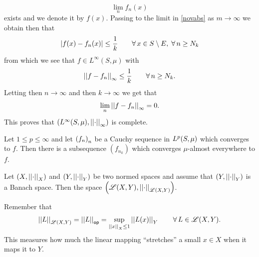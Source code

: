 \documentclass{article}
\begin{document}
\begin{fancyproof}
\begin{itemize}
\begin{equation*}
			\lim_{n}f_{n}(x)
		\end{equation*}
		exists and we denote it by $f(x)$. Passing to the limit in \ref{novabs} as $m\to\infty$ we obtain then that 
		\begin{equation*}
			\left|f(x)-f_{n}(x)\right|\leq\frac{1}{k}\qquad\forall\, x\in S\setminus E,\;\forall\, n\geq N_{k}
		\end{equation*}
		from which we see that $f\in L^{\infty}(S,\mu)$ with
		\begin{equation*}
			\left|\left|f-f_{n}\right|\right|_{\infty}\leq\frac{1}{k}\qquad\forall\, n\geq N_{k}.
		\end{equation*}
		Letting then $n\to\infty$ and then $k\to\infty$ we get that 
		\begin{equation*}
			\lim_{n}\left|\left|f-f_{n}\right|\right|_{\infty}=0.
		\end{equation*}
		This proves that $\left(L^{\infty}(S,\mu),\left|\left|\cdot\right|\right|_{\infty}\right)$ is complete.
	\end{itemize}
\end{fancyproof}
\begin{proposition}
	Let $1\leq p\leq\infty$ and let ${\left({f}_{n}\right)}_{n}$ be a Cauchy sequence in $L^{p}(S,\mu)$ which converges to $f$. Then there is a subsequence $\left(f_{n_{k}}\right)$ which converges $\mu$-almost everywhere to $f$.
\end{proposition}
\begin{proposition}
	Let $\left(X,\left|\left|\cdot\right|\right|_{X}\right)$ and $\left(Y,\left|\left|\cdot\right|\right|_{Y}\right)$ be two normed spaces and assume that $(Y,\left|\left|\cdot\right|\right|_{Y})$ is a Banach space. Then the space $\left(\mathscr{L}(X,Y),\left|\left|\cdot\right|\right|_{\mathscr{L}(X,Y)}\right)$.
\end{proposition}
Remember that 
\begin{equation*}
	\left|\left|L\right|\right|_{\mathscr{L}(X,Y)}=\left|\left|L\right|\right|_{\mathsf{op}}=\sup_{\left|\left|x\right|\right|_{X}\leq 1}\left|\left|L(x)\right|\right|_{Y}\qquad\forall\, L\in\mathscr{L}(X,Y).
\end{equation*}
This measures how much the linear mapping ``stretches'' a small $x\in X$ when it maps it to $Y$.
\end{document}
